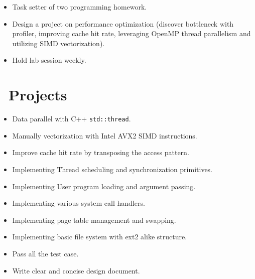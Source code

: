 \documentclass{resume}
\begin{document}
\begin{itemize}
	\item Task setter of two programming homework.
	\item Design a project on performance optimization (discover bottleneck with profiler, improving cache hit rate, leveraging OpenMP thread parallelism and utilizing SIMD vectorization).
	\item Hold lab session weekly.
\end{itemize}

\section{\faNetworkWired\ Projects}

\begin{itemize}
	\item Data parallel with C++ \texttt{std::thread}.
	\item Manually vectorization with Intel AVX2 SIMD instructions.
	\item Improve cache hit rate by transposing the access pattern.
\end{itemize}

\begin{itemize}
	\item Implementing Thread scheduling and synchronization primitives.
	\item Implementing User program loading and argument passing.
	\item Implementing various system call handlers.
	\item Implementing page table management and swapping.
	\item Implementing basic file system with ext2 alike structure.
	\item Pass all the test case.
	\item Write clear and concise design document.
\end{itemize}
\end{document}
